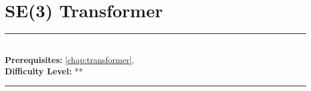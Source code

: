 \documentclass[book.tex]{subfiles}
\begin{document}
\chapter{SE(3) Transformer}
\label{chap:se3_transformer}
\noindent\rule{11cm}{0.4pt} \\
\textbf{Prerequisites:}  \autoref{chap:transformer},   \\
\textbf{Difficulty Level:} ** \\
\noindent\rule{11cm}{0.4pt}
\vspace{5mm}


\end{document}
